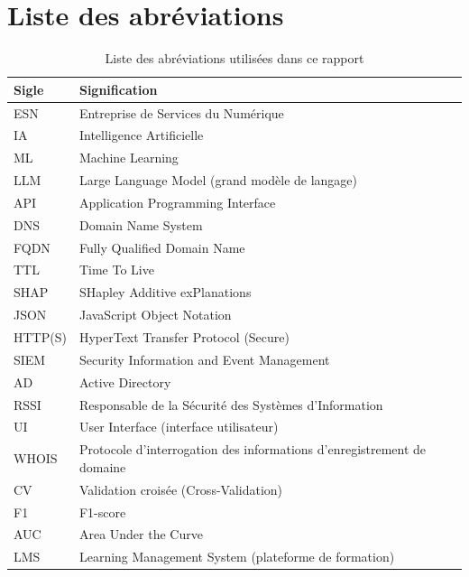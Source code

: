 \documentclass[12pt,a4paper]{report}
\begin{document}
\clearpage
{}

\chapter*{Liste des abréviations}
\begin{table}[htbp]
\centering
\begin{tabular}{@{}>{\raggedright\arraybackslash}p{2.5cm}>{\raggedright\arraybackslash}p{10.5cm}@{}}
\toprule
\textbf{Sigle} & \textbf{Signification} \\
\midrule
ESN & Entreprise de Services du Numérique \\
IA & Intelligence Artificielle \\
ML & Machine Learning \\
LLM & Large Language Model (grand modèle de langage) \\
API & Application Programming Interface \\
DNS & Domain Name System \\
FQDN & Fully Qualified Domain Name \\
TTL & Time To Live \\
SHAP & SHapley Additive exPlanations \\
JSON & JavaScript Object Notation \\
HTTP(S) & HyperText Transfer Protocol (Secure) \\
SIEM & Security Information and Event Management \\
AD & Active Directory \\
RSSI & Responsable de la Sécurité des Systèmes d'Information \\
UI & User Interface (interface utilisateur) \\
WHOIS & Protocole d'interrogation des informations d'enregistrement de domaine \\
CV & Validation croisée (Cross-Validation) \\
F1 & F1-score \\
AUC & Area Under the Curve \\
LMS & Learning Management System (plateforme de formation) \\
\bottomrule
\end{tabular}
\caption{Liste des abréviations utilisées dans ce rapport}
\end{table}
\end{document}

